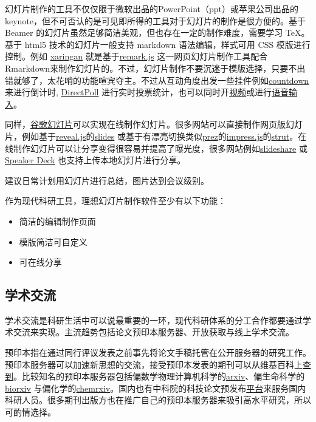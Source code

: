 \documentclass[]{tufte-book}
\providecommand{\tightlist}{%
  \setlength{\itemsep}{0pt}\setlength{\parskip}{0pt}}
\begin{document}
幻灯片制作的工具不仅仅限于微软出品的PowerPoint（ppt）或苹果公司出品的 keynote，但不可否认的是可见即所得的工具对于幻灯片的制作是很方便的。基于 Beamer 的幻灯片虽然足够简洁美观，但也存在一定的制作难度，需要学习 TeX。基于 html5 技术的幻灯片一般支持 markdown 语法编辑，样式可用 CSS 模版进行控制。例如 \href{https://github.com/yihui/xaringan}{xaringan} 就是基于\href{https://remarkjs.com}{remark.js} 这一网页幻灯片制作工具配合Rmarkdown来制作幻灯片的。不过，幻灯片制作不要沉迷于模版选择，只要不出错就够了，太花哨的功能喧宾夺主。不过从互动角度出发一些挂件例如\href{https://pkg.garrickadenbuie.com/countdown}{countdown} 来进行倒计时, \href{https://directpoll.com}{DirectPoll} 进行实时投票统计，也可以同时开\href{https://yihui.name/en/2017/12/html5-camera/}{视频}或进行\href{https://yihui.shinyapps.io/voice/}{语音输入}。

同样，\href{https://www.google.com/intl/zh-CN_us/slides/about/}{谷歌幻灯片}可以实现在线制作幻灯片。很多网站可以直接制作网页版幻灯片，例如基于\href{https://revealjs.com}{reveal.js}的\href{https://slides.com/}{slides} 或基于有漂亮切换类似\href{https://prezi.com/}{prez}的\href{https://impress.js.org/\#/source}{impress.js}的\href{http://strut.io}{strut}。在线制作幻灯片可以让分享变得很容易并提高了曝光度，很多网站例如\href{https://www.slideshare.net/}{slideshare} 或 \href{https://speakerdeck.com/}{Speaker Deck} 也支持上传本地幻灯片进行分享。

建议日常计划用幻灯片进行总结，图片达到会议级别。

作为现代科研工具，理想幻灯片制作软件至少有以下功能：

\begin{itemize}
\tightlist
\item
  简洁的编辑制作页面
\item
  模版简洁可自定义
\item
  可在线分享
\end{itemize}

\hypertarget{ux5b66ux672fux4ea4ux6d41}{%
\subsection*{学术交流}\label{ux5b66ux672fux4ea4ux6d41}}

学术交流是科研生活中可以说最重要的一环，现代科研体系的分工合作都要通过学术交流来实现。主流趋势包括论文预印本服务器、开放获取与线上学术交流。

预印本指在通过同行评议发表之前事先将论文手稿托管在公开服务器的研究工作。预印本服务器可以加速新思想的交流，接受预印本发表的期刊可以从维基百科上\href{https://en.wikipedia.org/wiki/List_of_academic_journals_by_preprint_policy}{查到}。比较知名的预印本服务器包括偏数学物理计算机科学的\href{https://arxiv.org/}{arxiv}、偏生命科学的\href{https://www.biorxiv.org/}{biorxiv} 与偏化学的\href{https://chemrxiv.org/}{chemrxiv}。国内也有中科院的科技论文预发布\href{http://chinaxiv.org/home.htm}{平台}来服务国内科研人员。很多期刊出版方也在推广自己的预印本服务器来吸引高水平研究，所以可酌情选择。
\end{document}

